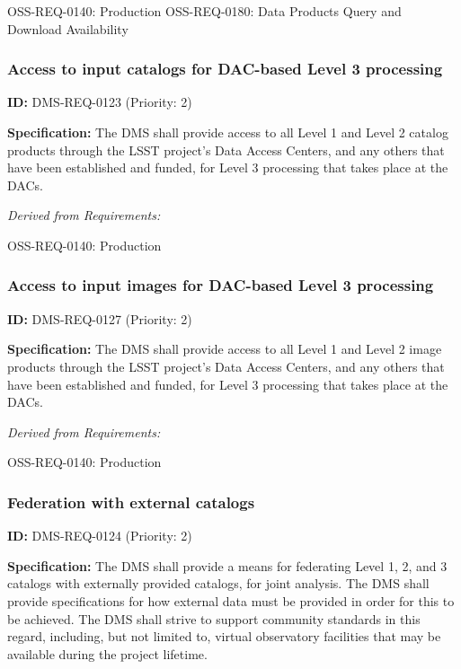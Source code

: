 \documentclass[SE,toc,lsstdraft]{lsstdoc}
\begin{document}
OSS-REQ-0140:
Production \newline
OSS-REQ-0180:
Data Products Query and Download Availability \newline

\subsubsection{Access to input catalogs for DAC-based Level 3 processing}

\label{DMS-REQ-0123}
\textbf{ID:} DMS-REQ-0123 (Priority: 2)

\textbf{Specification: }The DMS shall provide access to all Level 1 and Level 2 catalog products through the LSST project's Data Access Centers, and any others that have been established and funded, for Level 3 processing that takes place at the DACs.

\emph{Derived from Requirements:}

OSS-REQ-0140:
Production \newline

\subsubsection{Access to input images for DAC-based Level 3 processing}

\label{DMS-REQ-0127}
\textbf{ID:} DMS-REQ-0127 (Priority: 2)

\textbf{Specification:} The DMS shall provide access to all Level 1 and Level 2 image products through the LSST project's Data Access Centers, and any others that have been established and funded, for Level 3 processing that takes place at the DACs.

\emph{Derived from Requirements:}

OSS-REQ-0140:
Production \newline

\subsubsection{Federation with external catalogs}

\label{DMS-REQ-0124}
\textbf{ID:} DMS-REQ-0124 (Priority: 2)

\textbf{Specification: }The DMS shall provide a means for federating Level 1, 2, and 3 catalogs with externally provided catalogs, for joint analysis.  The DMS shall provide specifications for how external data must be provided in order for this to be achieved. The DMS shall strive to support community standards in this regard, including, but not limited to, virtual observatory facilities that may be available during the project lifetime.
\end{document}
